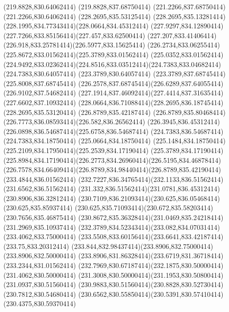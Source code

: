 {{	\closepath
	\moveto(219.8828,830.64062414)
	\lineto(219.8828,837.68750414)
	\lineto(221.2266,837.68750414)
	\lineto(221.2266,830.64062414)
	\closepath
	\moveto(228.2695,835.53125414)
	\curveto(228.2695,835.13281414)(228.1995,834.77343414)(228.0664,834.45312414)
	\curveto(227.9297,834.12890414)(227.7266,833.85156414)(227.457,833.62500414)
	\curveto(227.207,833.41406414)(226.918,833.25781414)(226.5977,833.15625414)
	\curveto(226.2734,833.06255414)(225.8672,833.01562414)(225.3789,833.01562414)
	\lineto(225.0352,833.01562414)
	\curveto(224.9492,833.02362414)(224.8516,833.03512414)(224.7383,833.04682414)
	\lineto(224.7383,830.64057414)
	\lineto(223.3789,830.64057414)
	\lineto(223.3789,837.68745414)
	\lineto(225.8008,837.68745414)
	\curveto(226.2578,837.68745414)(226.6289,837.64055414)(226.9102,837.54682414)
	\curveto(227.1914,837.46092414)(227.4414,837.31635414)(227.6602,837.10932414)
	\curveto(228.0664,836.71088414)(228.2695,836.18745414)(228.2695,835.53120414)
	\closepath
	\moveto(226.8789,835.42187414)
	\curveto(226.8789,835.80468414)(226.7773,836.08593414)(226.582,836.26562414)
	\curveto(226.3945,836.45312414)(226.0898,836.54687414)(225.6758,836.54687414)
	\lineto(224.7383,836.54687414)
	\lineto(224.7383,834.18750414)
	\lineto(225.0664,834.18750414)
	\curveto(225.1484,834.18750414)(225.2109,834.17950414)(225.2539,834.17190414)
	\lineto(225.3789,834.17190414)
	\curveto(225.8984,834.17190414)(226.2773,834.26960414)(226.5195,834.46878414)
	\curveto(226.7578,834.66409414)(226.8789,834.98440414)(226.8789,835.42190414)
	\closepath
	\moveto(233.4844,836.01562414)
	\curveto(232.7227,836.34765414)(232.1133,836.51562414)(231.6562,836.51562414)
	\curveto(231.332,836.51562414)(231.0781,836.45312414)(230.8906,836.32812414)
	\curveto(230.7109,836.21093414)(230.625,836.05468414)(230.625,835.85937414)
	\curveto(230.625,835.71093414)(230.672,835.58203414)(230.7656,835.46875414)
	\curveto(230.8672,835.36328414)(231.0469,835.24218414)(231.2969,835.10937414)
	\curveto(232.3789,834.52343414)(233.082,834.07031414)(233.4062,833.75000414)
	\curveto(233.5508,833.60156414)(233.6641,833.42187414)(233.75,833.20312414)
	\curveto(233.844,832.98437414)(233.8906,832.75000414)(233.8906,832.50000414)
	\curveto(233.8906,831.86328414)(233.6719,831.36718414)(233.2344,831.01562414)
	\curveto(232.7969,830.67187414)(232.1875,830.50000414)(231.4062,830.50000414)
	\curveto(231.3008,830.50000414)(231.1953,830.50800414)(231.0937,830.51560414)
	\curveto(230.9883,830.51560414)(230.8828,830.52730414)(230.7812,830.54680414)
	\curveto(230.6562,830.55850414)(230.5391,830.57410414)(230.4375,830.59370414)
}}

